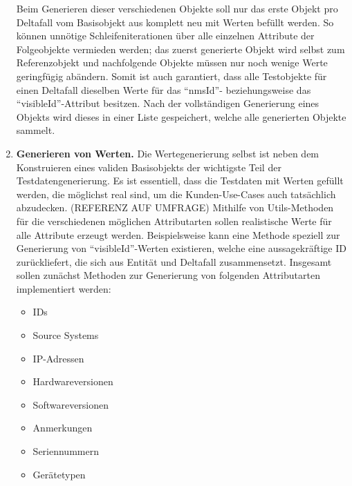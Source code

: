 \begin{enumerate}
    Beim Generieren dieser verschiedenen Objekte soll nur das erste Objekt pro Deltafall vom Basisobjekt aus komplett neu mit Werten befüllt werden. So können unnötige Schleifeniterationen über alle einzelnen Attribute der Folgeobjekte vermieden werden; das zuerst generierte Objekt wird selbst zum Referenzobjekt und nachfolgende Objekte müssen nur noch wenige Werte geringfügig abändern. Somit ist auch garantiert, dass alle Testobjekte für einen Deltafall dieselben Werte für das \enquote{nmsId}- beziehungsweise das \enquote{visibleId}-Attribut besitzen. Nach der vollständigen Generierung eines Objekts wird dieses in einer Liste gespeichert, welche alle generierten Objekte sammelt.
    \item \textbf{Generieren von Werten.} Die Wertegenerierung selbst ist neben dem Konstruieren eines validen Basisobjekts der wichtigste Teil der Testdatengenerierung. Es ist essentiell, dass die Testdaten mit Werten gefüllt werden, die möglichst real sind, um die Kunden-Use-Cases auch tatsächlich abzudecken. (REFERENZ AUF UMFRAGE) Mithilfe von Utils-Methoden für die verschiedenen möglichen Attributarten sollen realistische Werte für alle Attribute erzeugt werden. Beispielsweise kann eine Methode speziell zur Generierung von \enquote{visibleId}-Werten existieren, welche eine aussagekräftige ID zurückliefert, die sich aus Entität und Deltafall zusammensetzt. Insgesamt sollen zunächst Methoden zur Generierung von folgenden Attributarten implementiert werden:
    \begin{itemize}
        \item IDs
        \item Source Systems
        \item IP-Adressen
        \item Hardwareversionen
        \item Softwareversionen
        \item Anmerkungen
        \item Seriennummern
        \item Gerätetypen
    \end{itemize}


\end{enumerate}
